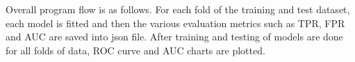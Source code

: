 Overall program flow is as follows. For each fold of the training and test dataset, each model is fitted and then the various evaluation metrics such as TPR, FPR and AUC are saved into json file. After training and testing of models are done for all folds of data, ROC curve and AUC charts are plotted.